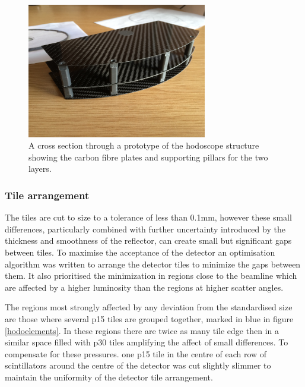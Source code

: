 \begin{figure}[!ht]
	\centering
	\includegraphics[width=0.7\textwidth]{ImgChap1/enclosure_hodoscope7}
	\caption{A cross section through a prototype of the hodoscope structure showing the carbon fibre plates and supporting pillars for the two layers.}
	\label{hodocrosssec}
\end{figure}


\subsubsection*{Tile arrangement}

The tiles are cut to size to a tolerance of less than 0.1mm, however these small differences, particularly combined with further uncertainty introduced by the thickness and smoothness of the reflector, can create small but significant gaps between tiles. To maximise the acceptance of the detector an optimisation algorithm was written to arrange the detector tiles to minimize the gaps between them. It also prioritised the minimization in regions close to the beamline which are affected by a higher luminosity than the regions at higher scatter angles.

The regions most strongly affected by any deviation from the standardised size are those where several p15 tiles are grouped together, marked in blue in figure \ref{hodoelements}. In these regions there are twice as many tile edge then in a similar space filled with p30 tiles amplifying the affect of small differences. To compensate for these pressures. one p15 tile in the centre of each row of scintillators around the centre of the detector was cut slightly slimmer to maintain the uniformity of the detector tile arrangement. 


